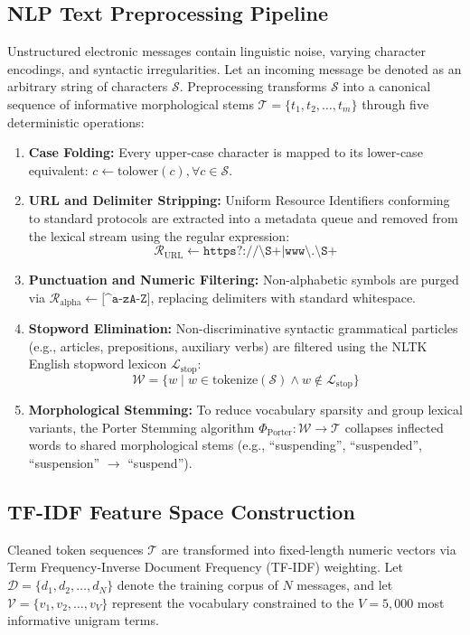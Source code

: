 \documentclass[conference]{IEEEtran}
\begin{document}
\subsection{NLP Text Preprocessing Pipeline}
Unstructured electronic messages contain linguistic noise, varying character encodings, and syntactic irregularities. Let an incoming message be denoted as an arbitrary string of characters $\mathcal{S}$. Preprocessing transforms $\mathcal{S}$ into a canonical sequence of informative morphological stems $\mathcal{T} = \{t_1, t_2, \dots, t_m\}$ through five deterministic operations:
\begin{enumerate}
    \item \textbf{Case Folding:} Every upper-case character is mapped to its lower-case equivalent: $c \leftarrow \text{tolower}(c), \forall c \in \mathcal{S}$.
    \item \textbf{URL and Delimiter Stripping:} Uniform Resource Identifiers conforming to standard protocols are extracted into a metadata queue and removed from the lexical stream using the regular expression:
    \begin{equation}
        \mathcal{R}_{\text{URL}} \leftarrow \texttt{https?://\textbackslash S+|www\textbackslash.\textbackslash S+}
    \end{equation}
    \item \textbf{Punctuation and Numeric Filtering:} Non-alphabetic symbols are purged via $\mathcal{R}_{\text{alpha}} \leftarrow \texttt{[\textasciicircum a-zA-Z]}$, replacing delimiters with standard whitespace.
    \item \textbf{Stopword Elimination:} Non-discriminative syntactic grammatical particles (e.g., articles, prepositions, auxiliary verbs) are filtered using the NLTK English stopword lexicon $\mathcal{L}_{\text{stop}}$:
    \begin{equation}
        \mathcal{W} = \{w \mid w \in \text{tokenize}(\mathcal{S}) \land w \notin \mathcal{L}_{\text{stop}}\}
    \end{equation}
    \item \textbf{Morphological Stemming:} To reduce vocabulary sparsity and group lexical variants, the Porter Stemming algorithm $\Phi_{\text{Porter}}: \mathcal{W} \rightarrow \mathcal{T}$ collapses inflected words to shared morphological stems (e.g., ``suspending'', ``suspended'', ``suspension'' $\rightarrow$ ``suspend'').
\end{enumerate}

\subsection{TF-IDF Feature Space Construction}
Cleaned token sequences $\mathcal{T}$ are transformed into fixed-length numeric vectors via Term Frequency-Inverse Document Frequency (TF-IDF) weighting. Let $\mathcal{D} = \{d_1, d_2, \dots, d_N\}$ denote the training corpus of $N$ messages, and let $\mathcal{V} = \{v_1, v_2, \dots, v_V\}$ represent the vocabulary constrained to the $V = 5,000$ most informative unigram terms.
\end{document}
